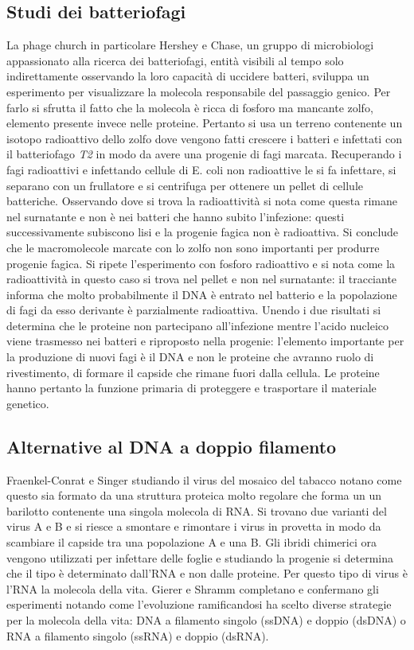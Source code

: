 	\subsection{Studi dei batteriofagi}
	La phage church in particolare Hershey e Chase, un gruppo di microbiologi appassionato alla ricerca dei batteriofagi, entit\`a visibili al tempo solo indirettamente osservando la loro capacit\`a di uccidere batteri, sviluppa un esperimento per visualizzare la molecola responsabile del passaggio genico. 
	Per farlo si sfrutta il fatto che la molecola \`e ricca di fosforo ma mancante zolfo, elemento presente invece nelle proteine. 
	Pertanto si usa un terreno contenente un isotopo radioattivo dello zolfo dove vengono fatti crescere i batteri e infettati con il batteriofago \emph{T2} in modo da avere una progenie di fagi marcata. 
	Recuperando i fagi radioattivi e infettando cellule di E. coli non radioattive le si fa infettare, si separano con un frullatore e si centrifuga per ottenere un pellet di cellule batteriche. 
	Osservando dove si trova la radioattivit\`a si nota come questa rimane nel surnatante e non \`e nei batteri che hanno subito l'infezione: questi successivamente subiscono lisi e la progenie fagica non \`e radioattiva. 
	Si conclude che le macromolecole marcate con lo zolfo non sono importanti per produrre progenie fagica. 
	Si ripete l'esperimento con fosforo radioattivo e si nota come la radioattivit\`a in questo caso si trova nel pellet e non nel surnatante: il tracciante informa che molto probabilmente il DNA \`e entrato nel batterio e la popolazione di fagi da esso derivante \`e parzialmente radioattiva. 
	Unendo i due risultati si determina che le proteine non partecipano all'infezione mentre l'acido nucleico viene trasmesso nei batteri e riproposto nella progenie: l'elemento importante per la produzione di nuovi fagi \`e il DNA e non le proteine che avranno ruolo di rivestimento, di formare il capside che rimane fuori dalla cellula. 
	Le proteine hanno pertanto la funzione primaria di proteggere e trasportare il materiale genetico. 

	\subsection{Alternative al DNA a doppio filamento}
	Fraenkel-Conrat e Singer studiando il virus del mosaico del tabacco notano come questo sia formato da una struttura proteica molto regolare che forma un un barilotto contenente una singola molecola di RNA. 
	Si trovano due varianti del virus A e B e si riesce a smontare e rimontare i virus in provetta in modo da scambiare il capside tra una popolazione A e una B. 
	Gli ibridi chimerici ora vengono utilizzati per infettare delle foglie e studiando la progenie si determina che il tipo \`e determinato dall'RNA e non dalle proteine. 
	Per questo tipo di virus \`e l'RNA la molecola della vita. 
	Gierer e Shramm completano e confermano gli esperimenti notando come l'evoluzione ramificandosi ha scelto diverse strategie per la molecola della vita: DNA a filamento singolo (ssDNA) e doppio (dsDNA) o RNA a filamento singolo (ssRNA) e doppio (dsRNA). 

